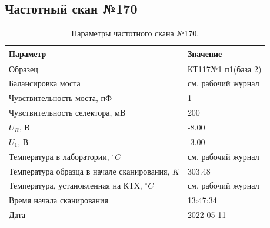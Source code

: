 \subsection{Частотный скан №170}
\begin{table}[!ht]
    \centering
    \caption{Параметры частотного скана №170.}
    \begin{tabular}{|l|l|}
        \hline
        Параметр                                       & Значение                  \\ \hline
        Образец                                        & КТ117№1 п1(база 2)        \\ \hline
        Балансировка моста                             & см. рабочий журнал        \\ \hline
        Чувствительность моста, пФ                     & 1                         \\ \hline
        Чувствительность селектора, мВ                 & 200                       \\ \hline
        $U_R$, В                                       & -8.00                     \\ \hline
        $U_1$, В                                       & -3.00                     \\ \hline
        Температура в лаборатории, $^\circ C$          & см. рабочий журнал        \\ \hline
        Температура образца в начале сканирования, $K$ & 303.48                    \\ \hline
        Температура, установленная на КТХ, $^\circ C$  & см. рабочий журнал        \\ \hline
        Время начала сканирования                      & 13:47:34                  \\ \hline
        Дата                                           & 2022-05-11                \\ \hline
    \end{tabular}
    \label{table:frequency_scan_170}
\end{table}

